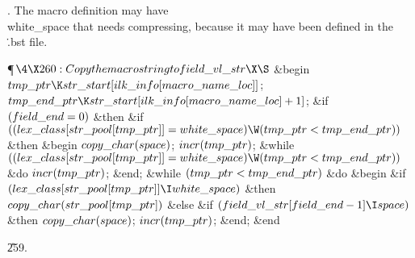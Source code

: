 .
The macro definition may have \\{white\_space} that needs compressing,
because it may have been defined in the \.{.bst} file.

\Y\P$\4\X260:Copy the macro string to \\{field\_vl\_str}\X\S$\6
\&{begin} $\\{tmp\_ptr}\K\\{str\_start}[\\{ilk\_info}[\\{macro\_name%
\_loc}]]$;\5
$\\{tmp\_end\_ptr}\K\\{str\_start}[\\{ilk\_info}[\\{macro\_name\_loc}]+1]$;\6
\&{if} $(\\{field\_end}=0)$ \1\&{then}\6
\&{if} $((\\{lex\_class}[\\{str\_pool}[\\{tmp\_ptr}]]=\\{white\_space})\W(%
\\{tmp\_ptr}<\\{tmp\_end\_ptr}))$ \1\&{then}\6
\&{begin} \6
$\\{copy\_char}(\\{space})$;\5
$\\{incr}(\\{tmp\_ptr})$;\6
\&{while} $((\\{lex\_class}[\\{str\_pool}[\\{tmp\_ptr}]]=\\{white\_space})\W(%
\\{tmp\_ptr}<\\{tmp\_end\_ptr}))$ \1\&{do}\5
$\\{incr}(\\{tmp\_ptr})$;\2\6
\&{end};\2\2\6
\&{while} $(\\{tmp\_ptr}<\\{tmp\_end\_ptr})$ \1\&{do}\6
\&{begin} \&{if} $(\\{lex\_class}[\\{str\_pool}[\\{tmp\_ptr}]]\I\\{white%
\_space})$ \1\&{then}\5
$\\{copy\_char}(\\{str\_pool}[\\{tmp\_ptr}])$\6
\4\&{else} \&{if} $(\\{field\_vl\_str}[\\{field\_end}-1]\I\\{space})$ \1%
\&{then}\5
$\\{copy\_char}(\\{space})$;\2\2\6
$\\{incr}(\\{tmp\_ptr})$;\6
\&{end};\2\6
\&{end}\par
\U259.\fi

